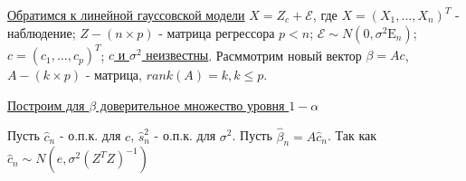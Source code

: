 \documentclass[12pt]{article}
\theoremstyle{basic_theorem}
\theoremstyle{name_theorem}
\def\Eps{
    \mathcal{E}
}
\def\E{
    \mathrm{E}
}
\begin{document}
    \underline{Обратимся к линейной гауссовской модели}
    $X=Z_c+\Eps$, где $X=(X_1,\ldots, X_n)^T$ - наблюдение; $Z - (n\times p)$ - матрица
    регрессора $p<n$; $\Eps\sim N(0, \sigma^2\E_n)$; $c=(c_1,\ldots, c_p)^T$;
    \underline{$c$ и $\sigma^2$ неизвестны}. Расммотрим новый вектор $\beta=Ac$, $A-(k\times p)$ - матрица,
    $rank(A)=k, k\leq p$.

    \underline{Построим для $\beta$ доверительное множество уровня $1-\alpha$}

    Пусть $\hat{c}_n$ - о.п.к. для $c$, $\hat{s}^2_n$ - о.п.к. для $\sigma^2$.
    Пусть $\hat{\beta}_n=A\hat{c}_n$. Так как $\hat{c}_n\sim N(e,\sigma^2(Z^TZ)^{-1})$
\end{document}
